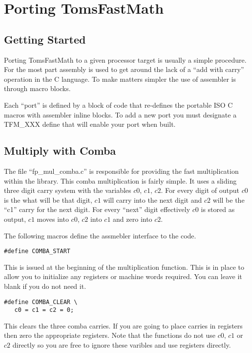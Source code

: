 \documentclass[b5paper]{book}
\begin{document}
\chapter{Porting TomsFastMath}
\label{chap:asmops}
\section{Getting Started}
Porting TomsFastMath to a given processor target is usually a simple procedure.  For the most part 
assembly is used to get around the lack of a ``add with carry'' operation in the C language.  To
make matters simpler the use of assembler is through macro blocks.

Each ``port'' is defined by a block of code that re-defines the portable ISO C macros with assembler
inline blocks.  To add a new port you must designate a TFM\_XXX define that will enable your 
port when built.

\section{Multiply with Comba}
The file ``fp\_mul\_comba.c'' is responsible for providing the fast multiplication within the 
library.  This comba multiplication is fairly simple.  It uses a sliding three digit carry 
system with the variables $c0$, $c1$, $c2$.  For every digit of output $c0$ is the what will
be that digit, $c1$ will carry into the next digit and $c2$ will be the ``c1'' carry for
the next digit.  For every ``next'' digit effectively $c0$ is stored as output, $c1$ moves into
$c0$, $c2$ into $c1$ and zero into $c2$.

The following macros define the assmebler interface to the code.

\begin{verbatim}
#define COMBA_START 
\end{verbatim}

This is issued at the beginning of the multiplication function.  This is in place to allow you to
initialize any registers or machine words required.  You can leave it blank if you do not need 
it.

\begin{verbatim}
#define COMBA_CLEAR \
   c0 = c1 = c2 = 0;
\end{verbatim}

This clears the three comba carries.  If you are going to place carries in registers then 
zero the appropriate registers.  Note that the functions do not use $c0$, $c1$ or $c2$ directly
so you are free to ignore these varibles and use registers directly.
\end{document}
